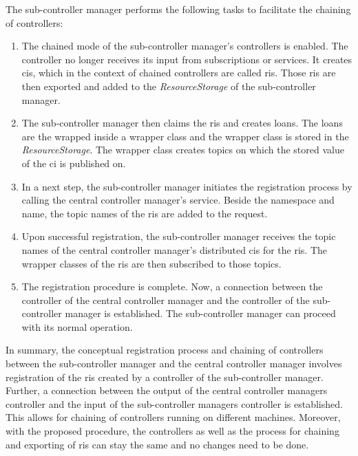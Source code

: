 The sub-controller manager performs the following tasks to facilitate the chaining of controllers:
\begin{enumerate}
    \item The chained mode of the sub-controller manager's controllers is enabled. The controller no longer receives its input from subscriptions or services. It creates \glspl{ci}, which in the context of chained controllers are called \glspl{ri}. Those \glspl{ri} are then exported and added to the \textit{ResourceStorage} of the sub-controller manager.

    \item The sub-controller manager then claims the \glspl{ri} and creates loans. The loans are the wrapped inside a wrapper class and the wrapper class is stored in the \textit{ResourceStorage}. The wrapper class creates topics on which the stored value of the \gls{ci} is published on.
        
    \item In a next step, the sub-controller manager initiates the registration process by calling the central controller manager's service. Beside the namespace and name, the topic names of the \glspl{ri} are added to the request.

    \item Upon successful registration, the sub-controller manager receives the topic names of the central controller manager's distributed \glspl{ci} for the \glspl{ri}. The wrapper classes of the \glspl{ri} are then subscribed to those topics.

    \item The registration procedure is complete. Now, a connection between the controller of the central controller manager and the controller of the sub-controller manager is established. The sub-controller manager can proceed with its normal operation.

\end{enumerate}
In summary, the conceptual registration process and chaining of controllers between the sub-controller manager and the central controller manager involves registration of the \glspl{ri} created by a controller of the sub-controller manager. Further, a connection between the output of the central controller managers controller and the input of the sub-controller managers controller is established. This allows for chaining of controllers running on different machines. Moreover, with the proposed procedure, the controllers as well as the process for chaining and exporting of \glspl{ri} can stay the same and no changes need to be done.
